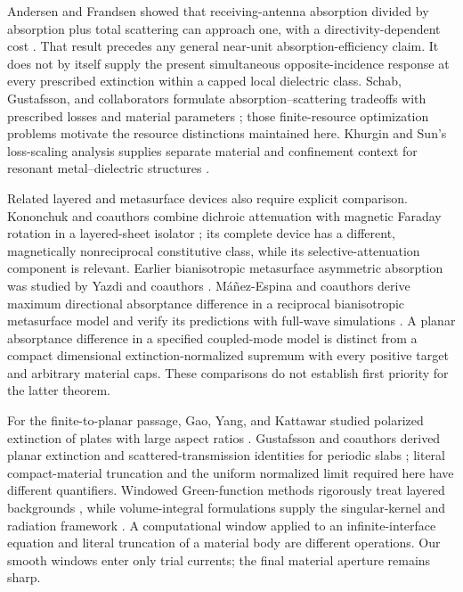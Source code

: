 \documentclass[11pt]{article}
\begin{document}
Andersen and Frandsen showed that receiving-antenna absorption divided by absorption plus total scattering can approach one, with a directivity-dependent cost \citep{AndersenFrandsen2005}. That result precedes any general near-unit absorption-efficiency claim. It does not by itself supply the present simultaneous opposite-incidence response at every prescribed extinction within a capped local dielectric class. Schab, Gustafsson, and collaborators formulate absorption--scattering tradeoffs with prescribed losses and material parameters \citep{Schab2020}; those finite-resource optimization problems motivate the resource distinctions maintained here. Khurgin and Sun's loss-scaling analysis supplies separate material and confinement context for resonant metal--dielectric structures \citep{KhurginSun2011}.

Related layered and metasurface devices also require explicit comparison. Kononchuk and coauthors combine dichroic attenuation with magnetic Faraday rotation in a layered-sheet isolator \citep{Kononchuk2019}; its complete device has a different, magnetically nonreciprocal constitutive class, while its selective-attenuation component is relevant. Earlier bianisotropic metasurface asymmetric absorption was studied by Yazdi and coauthors \citep{Yazdi2015}. M\'a\~nez-Espina and coauthors derive maximum directional absorptance difference in a reciprocal bianisotropic metasurface model and verify its predictions with full-wave simulations \citep{ManezEspina2026}. A planar absorptance difference in a specified coupled-mode model is distinct from a compact dimensional extinction-normalized supremum with every positive target and arbitrary material caps. These comparisons do not establish first priority for the latter theorem.

For the finite-to-planar passage, Gao, Yang, and Kattawar studied polarized extinction of plates with large aspect ratios \citep{Gao2013}. Gustafsson and coauthors derived planar extinction and scattered-transmission identities for periodic slabs \citep{Gustafsson2012}; literal compact-material truncation and the uniform normalized limit required here have different quantifiers. Windowed Green-function methods rigorously treat layered backgrounds \citep{Bruno2016,Arrieta2022}, while volume-integral formulations supply the singular-kernel and radiation framework \citep{YurkinMishchenko2018,MishchenkoYurkin2018}. A computational window applied to an infinite-interface equation and literal truncation of a material body are different operations. Our smooth windows enter only trial currents; the final material aperture remains sharp.
\end{document}
